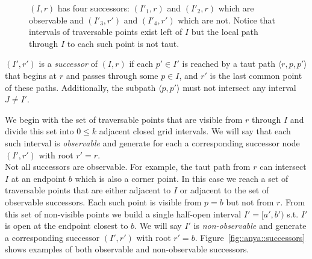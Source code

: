 \begin{figure}[tb]
  \begin{center}
    
  \end{center}
  \caption{$(I, r)$ has four successors: $(I'_1, r)$ and $(I'_2,r)$ which are observable and $(I'_3, r')$ and $(I'_4, r')$ which are not. Notice that intervals of traversable points exist left of $I$ but the local path through $I$ to each such point is not taut.}
\label{fig::anya::anya::successors}
\end{figure}

\begin{definition}
\label{definition::anya::successors}
$(I', r')$ is a \emph{successor} of
$(I, r)$ if each $p' \in I'$ is reached
by a taut path $\langle r, p,  p' \rangle$ that begins
at $r$ and passes through some $p \in I$, 
and $r'$ is the last common point of these paths.  Additionally, 
the subpath $\langle p, p' \rangle$ must not intersect any 
interval $J \neq I'$.
\end{definition}
We begin with the set of traversable points that are 
visible from $r$ through $I$ and divide this set into $0 \leq k$
adjacent closed grid intervals.
We will say that each such interval is \emph{observable} and 
generate for each a corresponding successor node 
$(I', r')$ with root $r' = r$.
\\
Not all successors are observable.
For example, the taut path from $r$ can intersect 
$I$ at an endpoint $b$ which is also a corner point.
In this case we reach a set of traversable points that 
are either adjacent to $I$ or adjacent to the set of 
observable successors.
Each such point is visible from $p = b$ but not 
from $r$.  From this set of non-visible points we build a 
single half-open interval $I' = [a', b')$ s.t. $I'$ is open at the 
endpoint closest to $b$.
We will say $I'$ is \emph{non-observable} and generate a 
corresponding successor $(I', r')$ with root $r' = b$.  
Figure~\ref{fig::anya::successors} shows examples of both
observable and non-observable successors.
%

